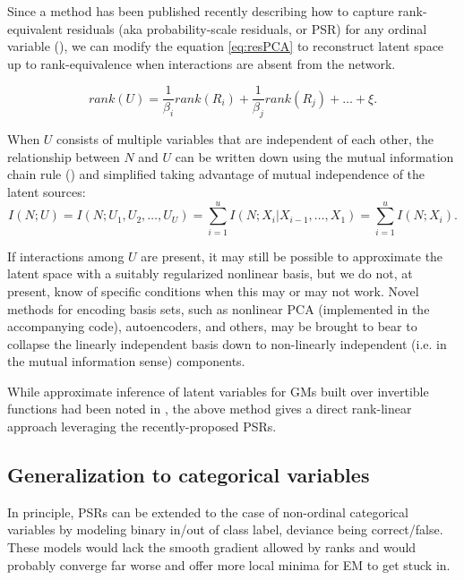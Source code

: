 \documentclass{article}
\begin{document}
Since a method has been published recently describing how to capture rank-equivalent residuals (aka probability-scale residuals, or PSR) for any ordinal variable (\cite{shepherd_probability-scale_2016}), we can modify the equation \ref{eq:resPCA} to reconstruct latent space up to rank-equivalence when interactions are absent from the network.

\begin{equation}
rank(U) = \frac{1}{\beta_i} rank(R_i) + \frac{1}{\beta_j} rank(R_j) + \dots + \xi. 
\label{resPcaGam}
\end{equation}

When $U$ consists of multiple variables that are independent of each other, the relationship between $N$ and $U$ can be written down using the mutual information chain rule (\cite{mackay_information_2003}) and simplified taking advantage of mutual independence of the latent sources:
\begin{equation}
\label{eq:rankSetRelationship}
I(N; U) = I(N; U_1, U_2, \dots, U_U) = \sum_{i=1}^{u}{I(N; X_i | X_{i-1}, \dots, X_1)} = \sum_{i=1}^{u}{I(N; X_i)}.
\end{equation}

If interactions among $U$ are present, it may still be possible to approximate the latent space with a suitably regularized nonlinear basis, but we do not, at present, know of specific conditions when this may or may not work.  Novel methods for encoding basis sets, such as nonlinear PCA (implemented in the accompanying code), autoencoders, and others, may be brought to bear to collapse the linearly independent basis down to non-linearly independent (i.e. in the mutual information sense) components.

While approximate inference of latent variables for GMs built over invertible functions had been noted in \cite{elidan_ideal_2007}, the above method gives a direct rank-linear approach leveraging the recently-proposed PSRs.

\subsection{Generalization to categorical variables}
In principle, PSRs can be extended to the case of non-ordinal categorical variables by modeling binary in/out of class label, deviance being correct/false.  These models would lack the smooth gradient allowed by ranks and would probably converge far worse and offer more local minima for EM to get stuck in.  
\end{document}

